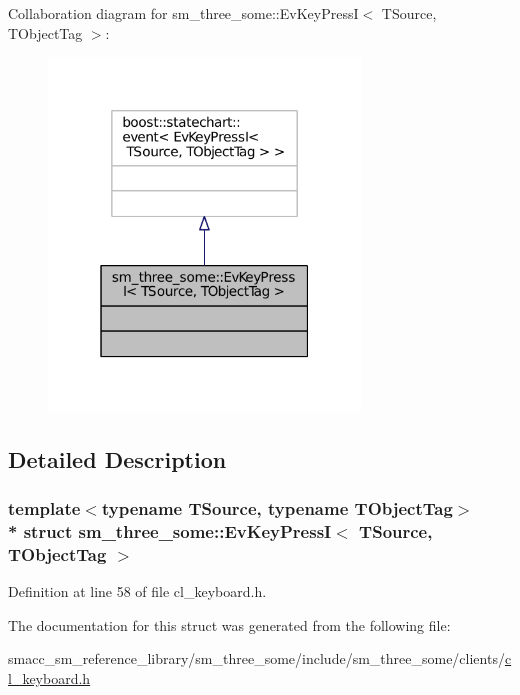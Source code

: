 Collaboration diagram for sm\+\_\+three\+\_\+some\+:\+:Ev\+Key\+PressI$<$ T\+Source, T\+Object\+Tag $>$\+:
\nopagebreak
\begin{figure}[H]
\begin{center}
\leavevmode
\includegraphics[width=235pt]{structsm__three__some_1_1EvKeyPressI__coll__graph}
\end{center}
\end{figure}


\subsection{Detailed Description}
\subsubsection*{template$<$typename T\+Source, typename T\+Object\+Tag$>$\\*
struct sm\+\_\+three\+\_\+some\+::\+Ev\+Key\+Press\+I$<$ T\+Source, T\+Object\+Tag $>$}



Definition at line 58 of file cl\+\_\+keyboard.\+h.



The documentation for this struct was generated from the following file\+:\begin{DoxyCompactItemize}
\item 
smacc\+\_\+sm\+\_\+reference\+\_\+library/sm\+\_\+three\+\_\+some/include/sm\+\_\+three\+\_\+some/clients/\hyperlink{cl__keyboard_8h}{cl\+\_\+keyboard.\+h}\end{DoxyCompactItemize}
